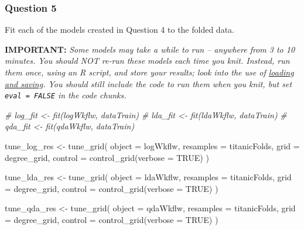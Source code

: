 \documentclass[
]{article}
\newenvironment{Shaded}{\begin{snugshade}}{\end{snugshade}}
\newcommand{\AttributeTok}[1]{\textcolor[rgb]{0.77,0.63,0.00}{#1}}
\newcommand{\CommentTok}[1]{\textcolor[rgb]{0.56,0.35,0.01}{\textit{#1}}}
\newcommand{\ConstantTok}[1]{\textcolor[rgb]{0.00,0.00,0.00}{#1}}
\newcommand{\FunctionTok}[1]{\textcolor[rgb]{0.00,0.00,0.00}{#1}}
\newcommand{\NormalTok}[1]{#1}
\newcommand{\OtherTok}[1]{\textcolor[rgb]{0.56,0.35,0.01}{#1}}
\begin{document}
\hypertarget{question-5}{%
\subsubsection{Question 5}\label{question-5}}

Fit each of the models created in Question 4 to the folded data.

\textbf{IMPORTANT:} \emph{Some models may take a while to run --
anywhere from 3 to 10 minutes. You should NOT re-run these models each
time you knit. Instead, run them once, using an R script, and store your
results; look into the use of
\href{https://www.r-bloggers.com/2017/04/load-save-and-rda-files/}{loading
and saving}. You should still include the code to run them when you
knit, but set \texttt{eval\ =\ FALSE} in the code chunks.}

\begin{Shaded}
\begin{Highlighting}[]
\CommentTok{\# log\_fit \textless{}{-} fit(logWkflw, dataTrain)}
\CommentTok{\# lda\_fit \textless{}{-} fit(ldaWkflw, dataTrain)}
\CommentTok{\# qda\_fit \textless{}{-} fit(qdaWkflw, dataTrain)}



\NormalTok{tune\_log\_res }\OtherTok{\textless{}{-}} \FunctionTok{tune\_grid}\NormalTok{(}
  \AttributeTok{object =}\NormalTok{ logWkflw,}
  \AttributeTok{resamples =}\NormalTok{ titanicFolds,}
  \AttributeTok{grid =}\NormalTok{ degree\_grid,}
  \AttributeTok{control =} \FunctionTok{control\_grid}\NormalTok{(}\AttributeTok{verbose =} \ConstantTok{TRUE}\NormalTok{)}
\NormalTok{)}


\NormalTok{tune\_lda\_res }\OtherTok{\textless{}{-}} \FunctionTok{tune\_grid}\NormalTok{(}
  \AttributeTok{object =}\NormalTok{ ldaWkflw,}
  \AttributeTok{resamples =}\NormalTok{ titanicFolds,}
  \AttributeTok{grid =}\NormalTok{ degree\_grid,}
  \AttributeTok{control =} \FunctionTok{control\_grid}\NormalTok{(}\AttributeTok{verbose =} \ConstantTok{TRUE}\NormalTok{)}
\NormalTok{)}


\NormalTok{tune\_qda\_res }\OtherTok{\textless{}{-}} \FunctionTok{tune\_grid}\NormalTok{(}
  \AttributeTok{object =}\NormalTok{ qdaWkflw,}
  \AttributeTok{resamples =}\NormalTok{ titanicFolds,}
  \AttributeTok{grid =}\NormalTok{ degree\_grid,}
  \AttributeTok{control =} \FunctionTok{control\_grid}\NormalTok{(}\AttributeTok{verbose =} \ConstantTok{TRUE}\NormalTok{)}
\NormalTok{)}
\end{Highlighting}
\end{Shaded}
\end{document}

